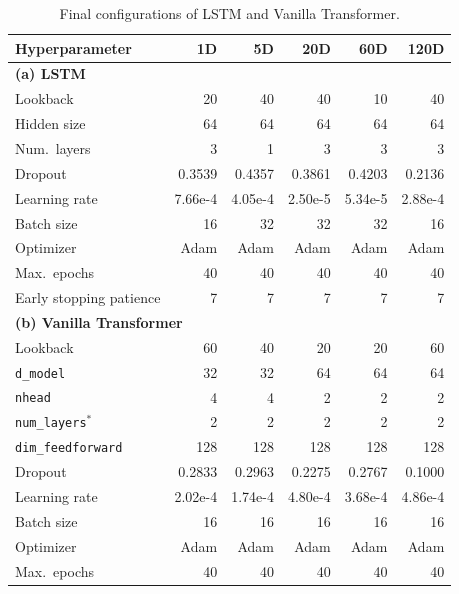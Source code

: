 \documentclass[12pt,twoside]{ord}
\begin{document}
\begin{table}[htbp]
\centering
\caption{Final configurations of LSTM and Vanilla Transformer.}\label{tab:config_lstm_transformer}
\setlength{\tabcolsep}{4.5pt}
\begin{tabular}{lrrrrr}
\hline
Hyperparameter & 1D & 5D & 20D & 60D & 120D \\
\hline
\multicolumn{6}{l}{\textbf{(a) LSTM}} \\
Lookback                & 20      & 40      & 40      & 10      & 40 \\
Hidden size             & 64      & 64      & 64      & 64      & 64 \\
Num.\ layers            & 3       & 1       & 3       & 3       & 3 \\
Dropout                 & 0.3539  & 0.4357  & 0.3861  & 0.4203  & 0.2136 \\
Learning rate           & 7.66e-4 & 4.05e-4 & 2.50e-5 & 5.34e-5 & 2.88e-4 \\
Batch size              & 16      & 32      & 32      & 32      & 16 \\
Optimizer               & Adam    & Adam    & Adam    & Adam    & Adam \\
Max.\ epochs            & 40      & 40      & 40      & 40      & 40 \\
Early stopping patience & 7       & 7       & 7       & 7       & 7 \\
\hline
\multicolumn{6}{l}{\textbf{(b) Vanilla Transformer}} \\
Lookback                & 60      & 40      & 20      & 20      & 60 \\
\texttt{d\_model}       & 32      & 32      & 64      & 64      & 64 \\
\texttt{nhead}          & 4       & 4       & 2       & 2       & 2 \\
\texttt{num\_layers}$^{\ast}$ & 2   & 2       & 2       & 2       & 2 \\
\texttt{dim\_feedforward} & 128   & 128     & 128     & 128     & 128 \\
Dropout                 & 0.2833  & 0.2963  & 0.2275  & 0.2767  & 0.1000 \\
Learning rate           & 2.02e-4 & 1.74e-4 & 4.80e-4 & 3.68e-4 & 4.86e-4 \\
Batch size              & 16      & 16      & 16      & 16      & 16 \\
Optimizer               & Adam    & Adam    & Adam    & Adam    & Adam \\
Max.\ epochs            & 40      & 40      & 40      & 40      & 40 \\

\end{tabular}
\end{table}
\end{document}
